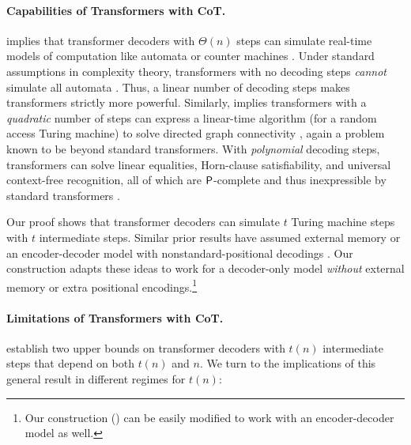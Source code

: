 \documentclass{article}
\begin{document}
\paragraph{Capabilities of Transformers with CoT.}  implies that transformer decoders with $\Theta(n)$ steps can simulate real-time models of computation like automata or counter machines \citep{merrill2021linguistic}. Under standard assumptions in complexity theory, transformers with no decoding steps \emph{cannot} simulate all automata \citep{merrill2023parallelism,merrill23icgi,liu2023transformers}. Thus, a linear number of decoding steps makes transformers strictly more powerful. Similarly,  implies transformers with a \emph{quadratic} number of steps can express a linear-time algorithm (for a random access Turing machine) to solve directed graph connectivity \citep{wigderson1992complexity}, again a problem known to be beyond standard transformers.
With \emph{polynomial} decoding steps, transformers can solve linear equalities, Horn-clause satisfiability, and universal context-free recognition, all of which are $\P$-complete and thus inexpressible by standard transformers \citep{merrill2023parallelism}.

Our proof shows that transformer decoders can simulate $t$ Turing machine steps with $t$ intermediate steps. Similar prior results have assumed external memory \citep{schuurmans2023memory} or an encoder-decoder model with nonstandard-positional decodings \citep{perez2021attention}. Our construction adapts these ideas to work for a decoder-only model \emph{without} external memory or extra positional encodings.\footnote{Our construction () can be easily modified to work with an encoder-decoder model as well.}


\paragraph{Limitations of Transformers with CoT.}
 establish two upper bounds on transformer decoders with $t(n)$ intermediate steps that depend on both $t(n)$ and $n$. We turn to the implications of this general result in different regimes for $t(n)$:
\end{document}
